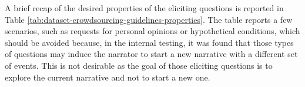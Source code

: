 A brief recap of the desired properties of the eliciting questions is reported in Table \ref{tab:dataset-crowdsourcing-guidelines-properties}.
The table reports a few scenarios, such as requests for personal opinions or hypothetical conditions, which should be avoided because, in the internal testing, it was found that those types of questions may induce the narrator to start a new narrative with a different set of events. This is not desirable as the goal of those eliciting questions is to explore the current narrative and not to start a new one.
